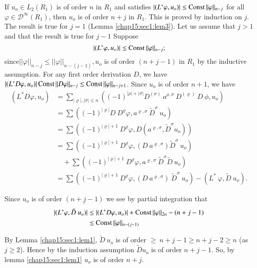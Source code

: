 \begin{first step}%
 If $u_o \in L_2 (R_1)$ is of order $n$ in $R_1$ and satisfies $|
 (L^* \varphi, u_o)| \le \operatorname{Const} || \varphi ||_{n-j}$ for all
 $\varphi \in \mathscr{D}^\infty(R_1)$, then $u_o$ is of order $n+j$
 in $R_1$. This is proved by induction on $j$. The result is true for
 $j = 1$ (Lemma \ref{chap15:sec1:lem3}). Let us assume that $j > 1$
 and that the result is true for $j - 1$ Suppose 
 $$
 | (L^* \varphi, u_o) | \le \operatorname{Const} || \varphi ||_{n-j};
 $$
 since\pageoriginale $|| \varphi ||_{n-j} \le || \varphi ||_{n-(j-1)}, u_o$ is of
 order $(n+j-1)$ in $R_1$ by the inductive assumption. For any first
 order derivation $D$, we have $| (L^*D\varphi,u_o)| \const\break || D
 \varphi ||_{n-j} \le \const || \varphi ||_{n-j+1}$. Since $u_o$ is
 of order $n+1$, we have 
 \begin{align*}
  (L^* D\varphi, u_o) & = \sum_{|\varrho |, |\sigma | \le n} 
  \left((-1)^{| \rho | + | \sigma |} D^{(\sigma)} ~ a^{\rho,\sigma}
  ~ D^{(\varrho)} ~ D ~ \phi, u_o \right)\\ 
  & = \sum \left((-1)^{|\varrho |} D ~ D^{\varrho}\varphi,
  a^{\varrho,\sigma} ~ \tilde{D}^{\sigma} ~ u_o\right)\\ 
  & = \sum \left((-1)^{|\varrho | + 1} ~ D^{\varrho} \varphi,
  D(a^{\varrho,\sigma}, \tilde{D}^\sigma u_o)\right)\\ 
  & = \sum \left((-1)^{|\varrho | + 1} ~ D^{\varrho} \varphi, (D ~
  a^{\varrho, \sigma}) \tilde{D}^{\sigma} ~ u_o\right)\\ 
  & \quad + \sum \left((-1)^{|\varrho| + 1} ~ D^{\varrho} \varphi,
  a^{\varrho,\sigma} ~ \tilde{D}^{\sigma}\tilde{D} ~ u_o\right)\\ 
  & = \sum \left((-1)^{|\varrho | + 1} ~ D^{\varrho} \varphi, (D ~
  a^{\varrho,\sigma}) ~ \tilde{D}^\sigma ~ u_o\right) - (L^* ~
  \varphi, \tilde{D} ~ u_o). 
 \end{align*}
\end{first step}

Since $u_o$ is of order $\underline{(n + j -1)}$ we see by partial
integration that 
\begin{align*}
 | (L^* \varphi, \tilde{D} ~ u_o) | & \le | (L^* D \varphi, u_o) | +
 \operatorname{Const}|| \varphi ||_{2n} - (n+j-1)\\ 
 & \le \operatorname{Const} || \varphi ||_{n-(j-1)} 
\end{align*}

By Lemma \ref{chap15:sec1:lem1}, $\tilde{D} ~u_o$ is of order $\ge ~ n+ j -1 \ge n+ j -2
\ge n $ (as $j\ge 2$). Hence by the induction assumption
$\tilde{D}u_o$ is of order $n + j - 1$. So, by lemma
\ref{chap15:sec1:lem1} $u_o$ is of order $n+j$. 

